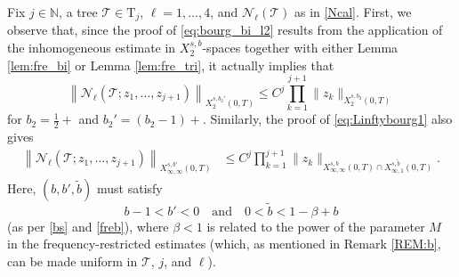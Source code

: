 \documentclass[a4paper,
11pt,  reqno]{amsart}
\newcommand{\5}{\textup{V}}
\newcommand{\wt}{\widetilde}
\theoremstyle{remark}
\newcommand{\TT}{\mathcal{T}}
\newcommand{\Tr}{\mathrm{T}}
\renewcommand{\l}{\ell}
\newcommand{\N}{\mathbb{N}}
\numberwithin{equation}{section}
\numberwithin{theorem}{section}
\newcommand{\Ncal}{\mathcal{N}}
\begin{document}
Fix $j\in\N$, a tree $\TT\in \Tr_j$,  $\ell=1,\dots,4$, and $\Ncal_\l(\TT)$ as in \eqref{Ncal}. First, we observe that, since the proof of \eqref{eq:bourg_bi_l2} results from the application of the inhomogeneous estimate in $X_2^{s,b}$-spaces together with either Lemma \ref{lem:fre_bi} or Lemma \ref{lem:fre_tri}, it actually implies that 
\begin{equation}\label{eq:L2_interp}
		\left\| \Ncal_\l(\TT; z_1,\dots, z_{j+1})\right\|_{X^{s,b_2'}_{2}(0,T)}  \le  C^j\prod_{k=1}^{j+1}\|z_k\|_{X^{s,b_2}_{2}(0,T)}
\end{equation}
for $b_2=\frac12 +$ and $b_2'=(b_2-1)+$. Similarly, the proof of \eqref{eq:Linftybourg1} also gives 
\begin{align*}
    \left\| \Ncal_\l(\TT; z_1,\dots, z_{j+1})\right\|_{X^{s,b'}_{\infty, \infty}(0,T)} &\le  C^j\prod_{k=1}^{j+1}\|z_k\|_{X^{s,b}_{\infty, \infty} (0,T) \cap X^{s,\wt{b}}_{\infty,1}(0,T)}.
\end{align*}
Here, $(b, b', \wt{b})$ must satisfy
\begin{equation}\label{eq:cond_lp}
    b-1<b'<0
    \quad
    \text{and}
    \quad 
    0<\wt{b}<1-\beta + b
\end{equation}
(as per \eqref{bs} and \eqref{freb}),
where $\beta<1$ is related to the power of the parameter $M$ in the frequency-restricted estimates (which, as mentioned in Remark \ref{REM:b}, can be made uniform in $\TT$, $j$, and $\l$).
\end{document}

